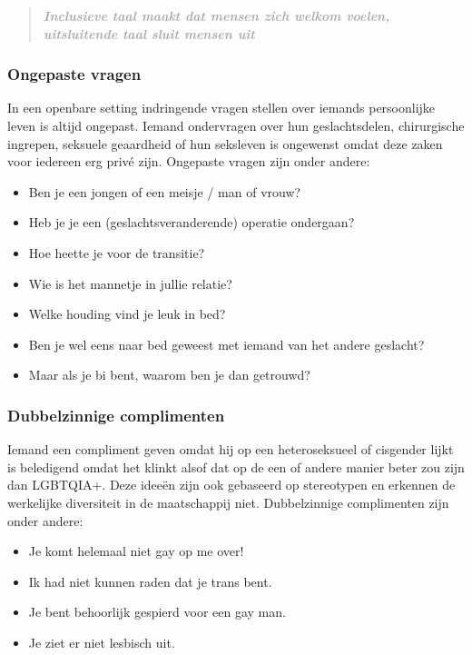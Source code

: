 \documentclass[12pt,openany]{book}
\begin{document}
\begin{quote}
\textit{\large \textbf{\textcolor{darkgray}{Inclusieve taal maakt dat mensen zich welkom voelen, uitsluitende taal sluit mensen uit}}}
\end{quote}

\subsubsection*{Ongepaste vragen}

In een openbare setting indringende vragen stellen over iemands persoonlijke leven is altijd ongepast. Iemand ondervragen over hun geslachtsdelen, chirurgische ingrepen, seksuele geaardheid of hun seksleven is ongewenst omdat deze zaken voor iedereen erg privé zijn. Ongepaste vragen zijn onder andere: 

\begin{itemize}
  \setlength\itemsep{-0.3em}
  \item Ben je een jongen of een meisje / man of vrouw?
  \item Heb je je een (geslachtsveranderende) operatie ondergaan?
  \item Hoe heette je voor de transitie?
  \item Wie is het mannetje in jullie relatie?
  \item Welke houding vind je leuk in bed?
  \item Ben je wel eens naar bed geweest met iemand van het andere geslacht?
  \item Maar als je bi bent, waarom ben je dan getrouwd?
\end{itemize}

\subsubsection*{Dubbelzinnige complimenten}

Iemand een compliment geven omdat hij op een heteroseksueel of cisgender lijkt is beledigend omdat het klinkt alsof dat op de een of andere manier beter zou zijn dan LGBTQIA+. Deze ideeën zijn ook gebaseerd op stereotypen en erkennen de werkelijke diversiteit in de maatschappij niet. Dubbelzinnige complimenten zijn onder andere: 
\begin{figure}
\end{figure}
\begin{itemize}
  \setlength\itemsep{-0.3em}
  \item Je komt helemaal niet gay op me over!
  \item Ik had niet kunnen raden dat je trans bent.
  \item Je bent behoorlijk gespierd voor een gay man.
  \item Je ziet er niet lesbisch uit.
\end{itemize}
\end{document}
